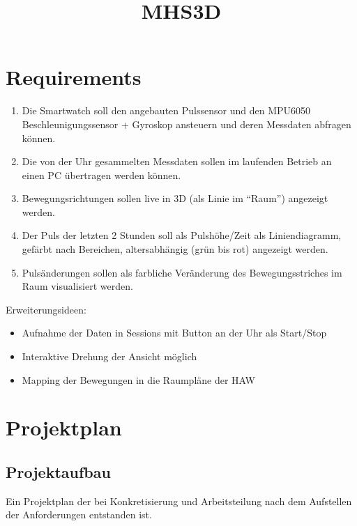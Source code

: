 \documentclass[a4paper, 11pt]{article}
\title{
    MHS3D
}
\begin{document}
\maketitle
\clearpage

\tableofcontents
\clearpage

%
\section{Requirements}
\begin{enumerate}
    \item Die Smartwatch soll den angebauten Pulssensor und den MPU6050 Beschleunigungssensor + Gyroskop ansteuern und deren Messdaten abfragen können.
    \item Die von der Uhr gesammelten Messdaten sollen im laufenden Betrieb an einen PC übertragen werden können.
    \item Bewegungsrichtungen sollen live in 3D (als Linie im “Raum”) angezeigt werden.
    \item Der Puls der letzten 2 Stunden soll als Pulshöhe/Zeit als Liniendiagramm, gefärbt nach Bereichen, altersabhängig (grün bis rot) angezeigt werden.
    \item Pulsänderungen sollen als farbliche Veränderung des Bewegungsstriches im Raum visualisiert werden.
\end{enumerate}

Erweiterungsideen:
\begin{itemize}
    \item Aufnahme der Daten in Sessions mit Button an der Uhr als Start/Stop
    \item Interaktive Drehung der Ansicht möglich
    \item Mapping der Bewegungen in die Raumpläne der HAW
\end{itemize}
\clearpage


\section{Projektplan}
\subsection{Projektaufbau}
Ein Projektplan der bei Konkretisierung und Arbeitsteilung nach dem Aufstellen der Anforderungen entstanden ist.
\end{document}
